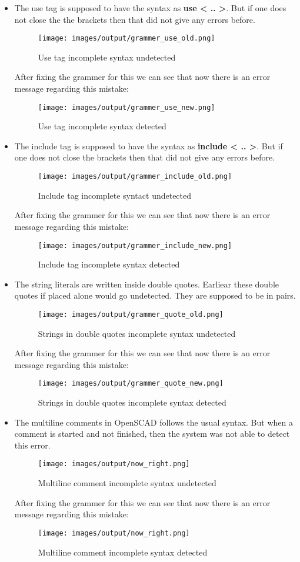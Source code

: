 \begin{itemize}
	\item The use tag is supposed to have the syntax as \textbf{use < .. >}. But if one does not close the the brackets then that did not give any errors before.
	\begin{figure}[H]
		\centering
		\texttt{[image: images/output/grammer\_use\_old.png]}
		\caption{Use tag incomplete syntax undetected}
	\end{figure}
	After fixing the grammer for this we can see that now there is an error message regarding this mistake:
	\begin{figure}[H]
		\centering
		\texttt{[image: images/output/grammer\_use\_new.png]}
		\caption{Use tag incomplete syntax detected}
	\end{figure}
	\item The include tag is supposed to have the syntax as \textbf{include < .. >}. But if one does not close the brackets then that did not give any errors before.
	\begin{figure}[H]
		\centering
		\texttt{[image: images/output/grammer\_include\_old.png]}
		\caption{Include tag incomplete syntact undetected}
	\end{figure}
	After fixing the grammer for this we can see that now there is an error message regarding this mistake:
	\begin{figure}[H]
		\centering
		\texttt{[image: images/output/grammer\_include\_new.png]}
		\caption{Include tag incomplete syntax detected}
	\end{figure}
	\item The string literals are written inside double quotes. Earliear these double quotes if placed alone would go undetected. They are supposed to be in pairs.
	\begin{figure}[H]
		\centering
		\texttt{[image: images/output/grammer\_quote\_old.png]}
		\caption{Strings in double quotes incomplete syntax undetected}
	\end{figure}
	After fixing the grammer for this we can see that now there is an error message regarding this mistake:
	\begin{figure}[H]
		\centering
		\texttt{[image: images/output/grammer\_quote\_new.png]}
		\caption{Strings in double quotes incomplete syntax detected}
	\end{figure}
	\item The multiline comments in OpenSCAD follows the usual syntax. But when a comment is started and not finished, then the system was not able to detect this error.
	\begin{figure}[H]
		\centering
		\texttt{[image: images/output/now\_right.png]}
		\caption{Multiline comment incomplete syntax undetected}
	\end{figure}
	After fixing the grammer for this we can see that now there is an error message regarding this mistake:
	\begin{figure}[H]
		\centering
		\texttt{[image: images/output/now\_right.png]}
		\caption{Multiline comment incomplete syntax detected}
	\end{figure}
\end{itemize}
